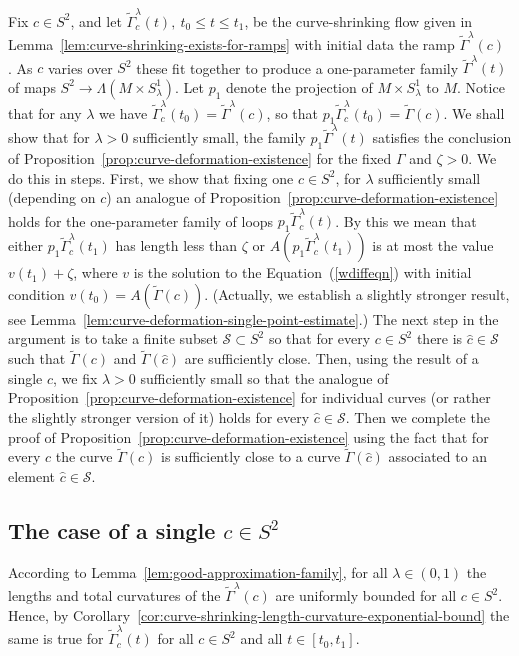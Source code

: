 Fix  $c\in S^2$, and let $\widetilde\Gamma_c^\lambda(t),\ t_0\le
t\le t_1$, be the curve-shrinking flow given in
Lemma~\ref{lem:curve-shrinking-exists-for-ramps} with initial data the ramp
$\widetilde\Gamma^\lambda(c)$ . As $c$ varies over $S^2$ these fit
together to produce a one-parameter family
$\widetilde\Gamma^\lambda(t)$ of maps $S^2\to\Lambda(M\times
S^1_\lambda)$. Let $p_1$ denote the projection of $M\times
S^1_\lambda$ to $M$. Notice that for any $\lambda$ we have
$\widetilde\Gamma^\lambda_c(t_0)=\widetilde\Gamma^\lambda(c)$, so
that $p_1\widetilde \Gamma_c^\lambda(t_0)=\widetilde \Gamma(c)$. We
shall show that for $\lambda>0$ sufficiently small, the family
$p_1\widetilde\Gamma^\lambda(t)$ satisfies the conclusion of
Proposition~\ref{prop:curve-deformation-existence} for the fixed $\Gamma$ and $\zeta>0$. We do
this in steps. First, we show that fixing one $c\in S^2$, for
$\lambda$ sufficiently small (depending on $c$) an analogue  of
Proposition~\ref{prop:curve-deformation-existence} holds for the one-parameter family of loops
$p_1\widetilde\Gamma_c^\lambda(t)$.  By this we mean that either
$p_1\widetilde\Gamma^\lambda_c(t_1)$ has length less than $\zeta$ or
$A(p_1\widetilde\Gamma^\lambda_c(t_1))$ is at most the value
$v(t_1)+\zeta$, where $v$ is the solution to the
Equation~(\ref{wdiffeqn}) with initial condition
$v(t_0)=A(\widetilde\Gamma(c))$. (Actually, we establish a slightly
stronger result, see Lemma~\ref{lem:curve-deformation-single-point-estimate}.) The next step in the
argument is to take a finite subset ${\mathcal S}\subset S^2$ so
that for every $c\in S^2$ there is $\hat c\in {\mathcal S}$ such
that $\widetilde\Gamma(c)$ and $\widetilde\Gamma(\hat c)$ are
sufficiently close. Then, using the result of a single $c$, we fix
$\lambda>0$ sufficiently small so that the analogue of
Proposition~\ref{prop:curve-deformation-existence} for individual curves (or rather the slightly
stronger version of it) holds for every $\hat c\in {\mathcal S}$.
Then we complete the proof of Proposition~\ref{prop:curve-deformation-existence} using the fact
that for every $c$ the curve $\widetilde\Gamma(c)$ is sufficiently
close to a curve $\widetilde\Gamma(\hat c)$ associated to an element
$\hat c\in {\mathcal S}$.

\subsection{The case of a single $c\in S^2$}



According to Lemma~\ref{lem:good-approximation-family}, for all $\lambda\in (0,1)$  the
lengths and total curvatures of the $\widetilde\Gamma^\lambda(c)$
are uniformly bounded for all $c\in S^2$. Hence, by
Corollary~\ref{cor:curve-shrinking-length-curvature-exponential-bound} the same is true for
$\widetilde\Gamma_c^\lambda(t)$ for all $c\in S^2$ and all $t\in
[t_0,t_1]$.

